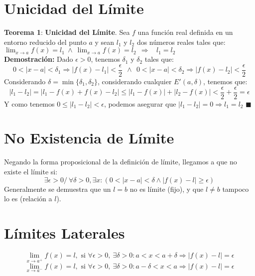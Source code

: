 \documentclass[11pt,a4paper]{article}
\newcommand*{\QEDA}{\null\nobreak\hfill\ensuremath{\blacksquare}}
\begin{document}
\section{Unicidad del L\'imite}
\noindent \textbf{Teorema 1}: \textbf{Unicidad del L\'imite}. Sea $f$ una funci\'on real definida en un entorno reducido del punto $a$ y sean $l_1$ y $l_2$ dos n\'umeros reales tales que: \ \ $\displaystyle{\lim_{x\to a}f(x)=l_1} \ \land \ \displaystyle{\lim_{x\to a}f(x)=l_2} \ \ \Rightarrow \ \ \ \ l_1 = l_2$\\
\textbf{Demostraci\'on: } Dado $\epsilon > 0$, tenemos $\delta_1$ y $\delta_2$ tales que: $$0 < |x-a| < \delta_1 \Rightarrow |f(x) - l_1| < \dfrac{\epsilon}{2} \ \ \land \ \ 0 < |x-a| < \delta_2 \Rightarrow |f(x) - l_2| < \dfrac{\epsilon}{2}$$
Considerando $\delta = \min\{\delta_1, \delta_2\}$, considerando cualquier $E'(a, \delta)$, tenemos que:
$$|l_1 - l_2| = |l_1 - f(x) + f(x) - l_2| \leq |l_1 - f(x)| + |l_2 - f(x)| < \dfrac{\epsilon}{2} + \dfrac{\epsilon}{2} = \epsilon$$
Y como tenemos $0 \leq |l_1 - l_2| < \epsilon$, podemos asegurar que $|l_1 - l_2| = 0 \Rightarrow l_1 = l_2$ \QEDA

\section{No Existencia de L\'imite}
Negando la forma proposicional de la definici\'on de l\'imite, llegamos a que no existe el l\'imite si: $$\exists \epsilon > 0 /\ \forall \delta > 0, \exists x: (0< |x-a| < \delta \land |f(x) - l| \geq \epsilon)$$
Generalmente se demuestra que un $l=b$ no es l\'imite (fijo), y que $l \not = b$ tampoco lo es (relaci\'on a $l$).

\section{L\'imites Laterales}
$$\lim_{x \to a^+} f(x) = l, \text{ si } \forall \epsilon > 0,\ \exists \delta > 0: a < x < a+\delta \Rightarrow |f(x)-l| = \epsilon$$
$$\lim_{x \to a^-} f(x) = l, \text{ si } \forall \epsilon > 0,\ \exists \delta > 0: a-\delta < x < a \Rightarrow |f(x)-l| = \epsilon$$\\
\end{document}
